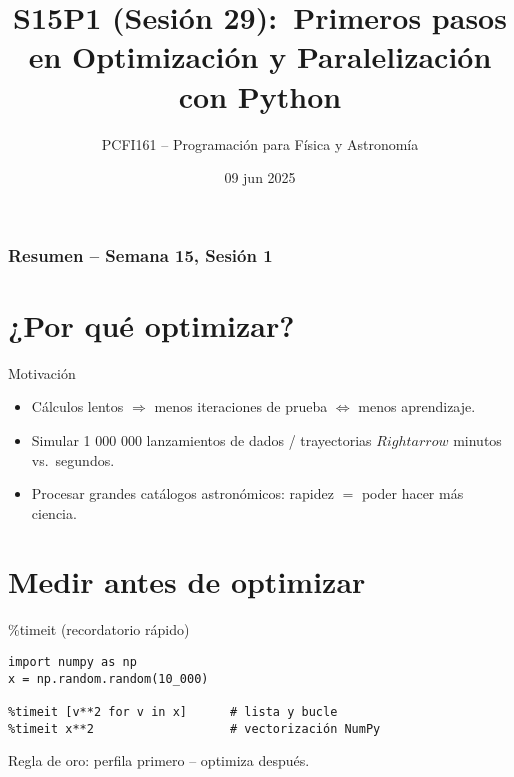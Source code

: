 \documentclass[10pt]{beamer}
\title{S15P1 (Sesión 29):\
Primeros pasos en Optimización y Paralelización con Python}
\author{PCFI161 -- Programación para Física y Astronomía}
\date{09 jun 2025}
\begin{document}
\myfront{}
\begin{frame}\titlepage\end{frame}

\begin{frame}\frametitle{Resumen -- Semana 15, Sesión 1}\tableofcontents\end{frame}
\metroset{block=fill}

\section{¿Por qué optimizar?}
\begin{frame}{Motivación}
\begin{itemize}
  \item Cálculos lentos $\Rightarrow$  menos iteraciones de prueba $\Leftrightarrow$  menos aprendizaje.
  \item Simular 1 000 000 lanzamientos de dados / trayectorias $Rightarrow$ minutos vs.\ segundos.
  \item Procesar grandes catálogos astronómicos: rapidez $=$ poder hacer más ciencia.
\end{itemize}
\end{frame}

\section{Medir antes de optimizar}
\begin{frame}[fragile]{\%timeit (recordatorio rápido)}
\begin{verbatim}
import numpy as np
x = np.random.random(10_000)

%timeit [v**2 for v in x]      # lista y bucle
%timeit x**2                   # vectorización NumPy
\end{verbatim}
\alert{Regla de oro}: perfila primero – optimiza después.
\end{frame}

\end{document}
